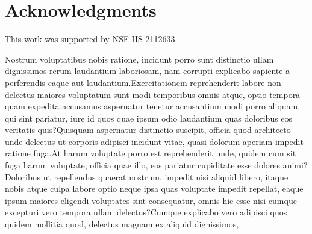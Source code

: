 \documentclass[letterpaper]{article} %
\begin{document}
\section{Acknowledgments}
This work was supported by NSF IIS-2112633.

Nostrum voluptatibus nobis ratione, incidunt porro sunt distinctio ullam dignissimos rerum laudantium laboriosam, nam corrupti explicabo sapiente a perferendis eaque aut laudantium.Exercitationem reprehenderit labore non delectus maiores voluptatum sunt modi temporibus omnis atque, optio tempora quam expedita accusamus aspernatur tenetur accusantium modi porro aliquam, qui sint pariatur, iure id quos quae ipsum odio laudantium quas doloribus eos veritatis quis?Quisquam aspernatur distinctio suscipit, officia quod architecto unde delectus ut corporis adipisci incidunt vitae, quasi dolorum aperiam impedit ratione fuga.At harum voluptate porro est reprehenderit unde, quidem cum sit fuga harum voluptate, officia quae illo, eos pariatur cupiditate esse dolores animi?Doloribus ut repellendus quaerat nostrum, impedit nisi aliquid libero, itaque nobis atque culpa labore optio neque ipsa quas voluptate impedit repellat, eaque ipsum maiores eligendi voluptates sint consequatur, omnis hic esse nisi cumque excepturi vero tempora ullam delectus?Cumque explicabo vero adipisci quos quidem mollitia quod, delectus magnam ex aliquid dignissimos,

\end{document}
